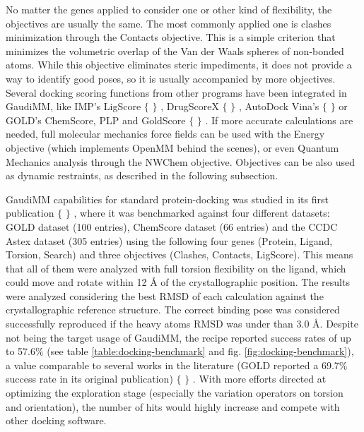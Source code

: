 No matter the genes applied to consider one or other kind of flexibility, the objectives are usually the same. The most commonly applied one is clashes minimization through the Contacts objective. This is a simple criterion that minimizes the volumetric overlap of the Van der Waals spheres of non-bonded atoms. While this objective eliminates steric impediments, it does not provide a way to identify good poses, so it is usually accompanied by more objectives. Several docking scoring functions from other programs have been integrated in GaudiMM, like IMP’s LigScore $ \{ $ $ \} $ , DrugScoreX $ \{ $ $ \} $ , AutoDock Vina’s $ \{ $ $ \} $  or GOLD’s ChemScore, PLP and GoldScore $ \{ $ $ \} $ . If more accurate calculations are needed, full molecular mechanics force fields can be used with the Energy objective (which implements OpenMM behind the scenes), or even Quantum Mechanics analysis through the NWChem objective. Objectives can be also used as dynamic restraints, as described in the following subsection.


GaudiMM capabilities for standard protein-docking was studied in its first publication $ \{ $ $ \} $ , where it was benchmarked against four different datasets: GOLD dataset (100 entries), ChemScore dataset (66 entries) and the CCDC Astex dataset (305 entries) using the following four genes (Protein, Ligand, Torsion, Search) and three objectives (Clashes, Contacts, LigScore). This means that all of them were analyzed with full torsion flexibility on the ligand, which could move and rotate within 12 Å of the crystallographic position. The results were analyzed considering the best RMSD of each calculation against the crystallographic reference structure. The correct binding pose was considered successfully reproduced if the heavy atoms RMSD was under than 3.0 Å. Despite not being the target usage of GaudiMM, the recipe reported success rates of up to 57.6$\%$ (see table \ref{table:docking-benchmark} and fig. \ref{fig:docking-benchmark}), a value comparable to several works in the literature (GOLD reported a 69.7$\%$  success rate in its original publication) $ \{ $ $ \} $ . With more efforts directed at optimizing the exploration stage (especially the variation operators on torsion and orientation), the number of hits would highly increase and compete with other docking software.







